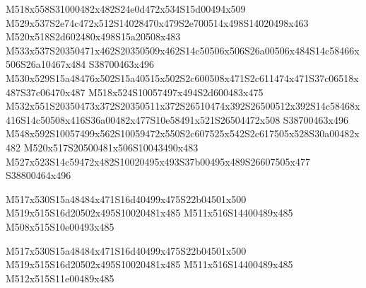 \documentclass{article}
\begin{document}
\begin{multicols}{2}
M518x558S31000482x482S24e0d472x534S15d00494x509 M529x537S2e74c472x512S14028470x479S2e700514x498S14020498x463 M520x518S2d602480x498S15a20508x483 M533x537S20350471x462S20350509x462S14c50506x506S26a00506x484S14c58466x506S26a10467x484 S38700463x496 M530x529S15a48476x502S15a40515x502S2c600508x471S2c611474x471S37c06518x487S37c06470x487 M518x524S10057497x494S2d600483x475 M532x551S20350473x372S20350511x372S26510474x392S26500512x392S14c58468x416S14c50508x416S36a00482x477S10e58491x521S26504472x508 S38700463x496 M548x592S10057499x562S10059472x550S2c607525x542S2c617505x528S30a00482x482 M520x517S20500481x506S10043490x483 M527x523S14c59472x482S10020495x493S37b00495x489S26607505x477 S38800464x496

\begin{center}
M517x530S15a48484x471S16d40499x475S22b04501x500 M519x515S16d20502x495S10020481x485 M511x516S14400489x485 M508x515S10e00493x485 
\end{center}









\begin{center}
M517x530S15a48484x471S16d40499x475S22b04501x500 M519x515S16d20502x495S10020481x485 M511x516S14400489x485 M512x515S11e00489x485 
\end{center}




\end{multicols}
\end{document}
